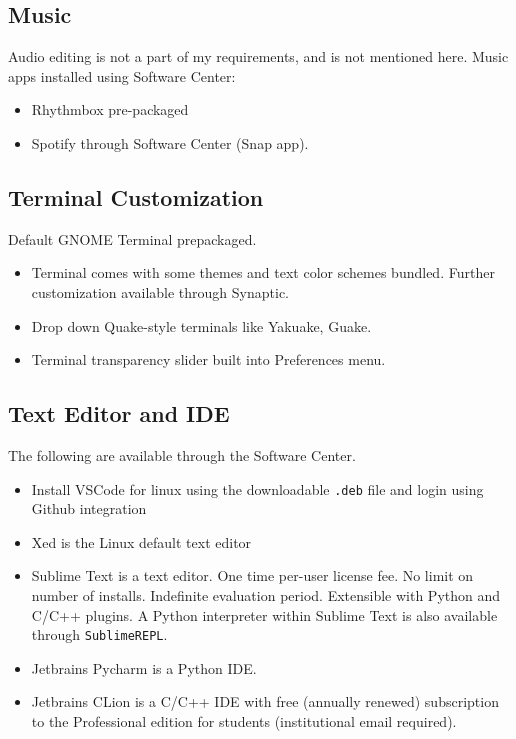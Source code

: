 \documentclass[8pt,letterpaper,twocolumn]{article}
\begin{document}
\subsection{Music}

Audio editing is not a part of my requirements, and is not mentioned here.
Music apps installed using Software Center:

\begin{itemize}
	\item Rhythmbox pre-packaged
	\item Spotify through Software Center (Snap app).
\end{itemize}

\subsection{Terminal Customization}

Default GNOME Terminal prepackaged.

\begin{itemize}
	\item Terminal comes with some themes and text color schemes bundled. Further customization available through Synaptic.
	\item Drop down Quake-style terminals like Yakuake, Guake.
	\item Terminal transparency slider built into Preferences menu.
\end{itemize}

\subsection{Text Editor and IDE}
The following are available through the Software Center.

\begin{itemize}
	\item Install VSCode for linux using the downloadable \texttt{.deb} file and login using Github integration
	\item Xed is the Linux default text editor
	\item Sublime Text is a text editor. One time per-user license fee. No limit on number of installs. Indefinite evaluation period. Extensible with Python and C/C++ plugins. A Python interpreter within Sublime Text is also available through \texttt{SublimeREPL}. 
	\item Jetbrains Pycharm is a Python IDE.
	\item Jetbrains CLion is a C/C++ IDE with free (annually renewed) subscription to the Professional edition for students (institutional email required).
\end{itemize}
\end{document}
